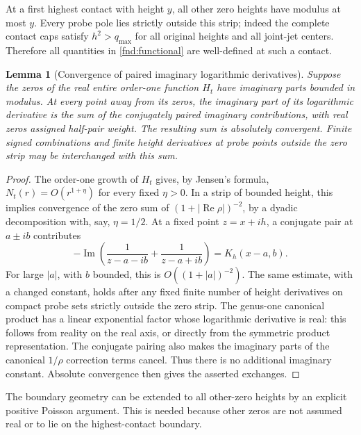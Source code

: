 \documentclass[11pt,a4paper]{article}
\newtheorem{lemma}[theorem]{Lemma}
\theoremstyle{definition}
\theoremstyle{remark}
\newcommand{\Ree}{\operatorname{Re}}
\newcommand{\Imm}{\operatorname{Im}}
\begin{document}
At a first highest contact with height $y$, all other zero heights have
modulus at most $y$. Every probe pole lies strictly outside this strip;
indeed the complete contact caps satisfy $h^2>q_{\max}$ for all original
heights and all joint-jet centers. Therefore all quantities in
\eqref{fnd:functional} are well-defined at such a contact.

\begin{lemma}[Convergence of paired imaginary logarithmic derivatives]
\label{fnd:convergence}
Suppose the zeros of the real entire order-one function $H_t$ have
imaginary parts bounded in modulus. At every point away from its zeros, the imaginary
part of its logarithmic derivative is the sum of the conjugately paired
imaginary contributions, with real zeros assigned half-pair weight.
The resulting sum is absolutely convergent. Finite signed combinations
and finite height derivatives at probe points outside the zero strip may
be interchanged with this sum.
\end{lemma}
\begin{proof}
The order-one growth of $H_t$ gives, by Jensen's formula,
$N_t(r)=O(r^{1+\eta})$ for every fixed $\eta>0$. In a strip of bounded
height, this implies convergence of the zero sum of $(1+|\Ree\rho|)^{-2}$,
by a dyadic decomposition with, say, $\eta=1/2$.
At a fixed point $z=x+ih$, a conjugate pair at $a\pm ib$ contributes
\[
 -\Imm\left(\frac1{z-a-ib}+\frac1{z-a+ib}\right)
       =K_h(x-a,b).
\]
For large $|a|$, with $b$ bounded, this is $O((1+|a|)^{-2})$.
The same estimate, with a changed constant, holds after any fixed finite
number of height derivatives on compact probe sets strictly outside the
zero strip. The genus-one canonical product has a linear exponential
factor whose logarithmic derivative is real: this follows from reality
on the real axis, or directly from the symmetric product representation.
The conjugate pairing also makes the imaginary parts of the canonical
$1/\rho$ correction terms cancel. Thus there is no additional imaginary
constant. Absolute convergence then gives the asserted exchanges.
\end{proof}

The boundary geometry can be extended to all other-zero heights by an
explicit positive Poisson argument. This is needed because other zeros
are not assumed real or to lie on the highest-contact boundary.
\end{document}
